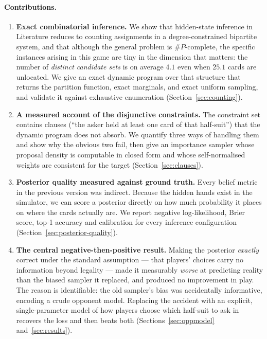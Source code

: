 \documentclass[11pt,a4paper]{article}
\begin{document}
\paragraph{Contributions.}
\begin{enumerate}
\item \textbf{Exact combinatorial inference.} We show that hidden-state
inference in Literature reduces to counting assignments in a
degree-constrained bipartite system, and that although the general problem is
$\#P$-complete, the specific instances arising in this game are tiny in the
dimension that matters: the number of \emph{distinct candidate sets} is on
average $4.1$ even when $25.1$ cards are unlocated. We give an exact dynamic
program over that structure that returns the partition function, exact
marginals, and exact uniform sampling, and validate it against exhaustive
enumeration (Section~\ref{sec:counting}).

\item \textbf{A measured account of the disjunctive constraints.} The
constraint set contains clauses (``the asker held at least one card of that
half-suit'') that the dynamic program does not absorb. We quantify three ways
of handling them and show why the obvious two fail, then give an importance
sampler whose proposal density is computable in closed form and whose
self-normalised weights are consistent for the target
(Section~\ref{sec:clauses}).

\item \textbf{Posterior quality measured against ground truth.} Every belief
metric in the previous version was indirect. Because the hidden hands exist in
the simulator, we can score a posterior directly on how much probability it
places on where the cards actually are. We report negative log-likelihood,
Brier score, top-1 accuracy and calibration for every inference configuration
(Section~\ref{sec:posterior-quality}).

\item \textbf{The central negative-then-positive result.} Making the posterior
\emph{exactly} correct under the standard assumption --- that players' choices
carry no information beyond legality --- made it measurably \emph{worse} at
predicting reality than the biased sampler it replaced, and produced no
improvement in play. The reason is identifiable: the old sampler's bias was
accidentally informative, encoding a crude opponent model. Replacing the
accident with an explicit, single-parameter model of how players choose which
half-suit to ask in recovers the loss and then beats both
(Sections~\ref{sec:oppmodel} and~\ref{sec:results}).


\end{enumerate}
\end{document}
